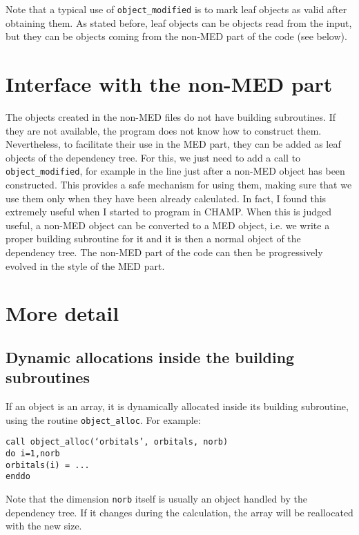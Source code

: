 \documentclass[a4paper,11pt]{article}
\begin{document}
Note that a typical use of {\tt object_modified} is to mark leaf objects as valid after obtaining them.
As stated before, leaf objects can be objects read from the input, but they can be objects coming from the non-MED part of the code (see below).

\section{Interface with the non-MED part}

The objects created in the non-MED files do not have building subroutines. If they are not available, the program does not know how to construct them. Nevertheless, to facilitate their use in the MED part, they can be added as leaf objects of the dependency tree. For this, we just need to add a call to {\tt object_modified}, for example in the line just after a non-MED object has been constructed. This provides a safe mechanism for using them, making sure that we use them only when they have been already calculated. In fact, I found this extremely useful when I started to program in CHAMP. 
When this is judged useful, a non-MED object can be converted to a MED object, i.e. we write a proper building subroutine for it and it is then a normal object of the dependency tree. The non-MED part of the code can then be progressively evolved in the style of the MED part.


\section{More detail}

\subsection{Dynamic allocations inside the building subroutines}

If an object is an array, it is dynamically allocated inside its building subroutine, using the routine {\tt object_alloc}. For example:

\vspace{0.5cm}
\noindent
{\tt call object_alloc(`orbitals', orbitals, norb)\\
do i=1,norb\\
\phantom{xx} orbitals(i) = ...\\
enddo}
\vspace{0.5cm}

Note that the dimension {\tt norb} itself is usually an object handled by the dependency tree. If it changes during the calculation, the array will be reallocated with the new size.
\end{document}
